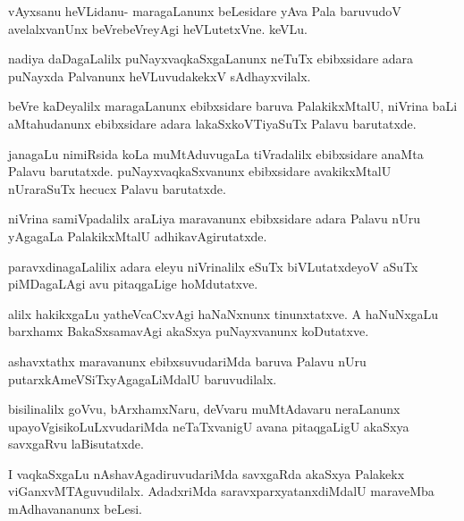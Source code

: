 \documentclass{article}
\begin{document}
\begin{mng}%
vAyxsanu heVLidanu- maragaLanunx beLesidare yAva Pala baruvudoV 
avelalxvanUnx beVrebeVreyAgi heVLutetxVne. keVLu.
\end{mng}

\begin{mng}%
nadiya daDagaLalilx puNayxvaqkaSxgaLanunx neTuTx ebibxsidare adara 
puNayxda Palvanunx heVLuvudakekxV sAdhayxvilalx.
\end{mng}

\begin{mng}%
beVre kaDeyalilx maragaLanunx ebibxsidare baruva PalakikxMtalU, 
niVrina baLi aMtahudanunx ebibxsidare adara lakaSxkoVTiyaSuTx Palavu 
barutatxde.
\end{mng}

\begin{mng}%
janagaLu nimiRsida koLa muMtAduvugaLa tiVradalilx ebibxsidare anaMta 
Palavu barutatxde. puNayxvaqkaSxvanunx ebibxsidare avakikxMtalU 
nUraraSuTx hecucx Palavu barutatxde.
\end{mng}

\begin{mng}%
niVrina samiVpadalilx araLiya maravanunx ebibxsidare adara Palavu nUru 
yAgagaLa PalakikxMtalU adhikavAgirutatxde.
\end{mng}

\begin{mng}%
paravxdinagaLalilix adara eleyu niVrinalilx eSuTx biVLutatxdeyoV aSuTx 
piMDagaLAgi avu pitaqgaLige hoMdutatxve.
\end{mng}

\begin{mng}%
alilx hakikxgaLu yatheVcaCxvAgi haNaNxnunx tinunxtatxve. A haNuNxgaLu 
barxhamx BakaSxsamavAgi akaSxya puNayxvanunx koDutatxve.
\end{mng}

\begin{mng}%
ashavxtathx maravanunx ebibxsuvudariMda baruva Palavu nUru 
putarxkAmeVSiTxyAgagaLiMdalU baruvudilalx.
\end{mng}

\begin{mng}%
bisilinalilx goVvu, bArxhamxNaru, deVvaru muMtAdavaru neraLanunx 
upayoVgisikoLuLxvudariMda neTaTxvanigU avana pitaqgaLigU akaSxya 
savxgaRvu laBisutatxde.
\end{mng}

\begin{mng}%
I vaqkaSxgaLu nAshavAgadiruvudariMda savxgaRda akaSxya Palakekx 
viGanxvMTAguvudilalx. AdadxriMda saravxparxyatanxdiMdalU maraveMba 
mAdhavananunx beLesi.
\end{mng}
\end{document}
